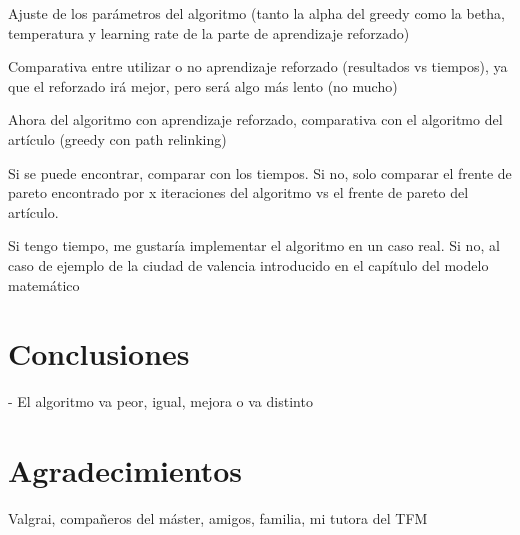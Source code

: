 \documentclass[12pt,a4paper]{book}
\begin{document}
Ajuste de los parámetros del algoritmo (tanto la alpha del greedy como la betha, temperatura y learning rate de la parte de aprendizaje reforzado)

Comparativa entre utilizar o no aprendizaje reforzado (resultados vs tiempos), ya que el reforzado irá mejor, pero será algo más lento (no mucho)

Ahora del algoritmo con aprendizaje reforzado, comparativa con el algoritmo del artículo (greedy con path relinking)

Si se puede encontrar, comparar con los tiempos. Si no, solo comparar el frente de pareto encontrado por x iteraciones del algoritmo vs el frente de pareto del artículo.

Si tengo tiempo, me gustaría implementar el algoritmo en un caso real. Si no, al caso de ejemplo de la ciudad de valencia introducido en el capítulo del modelo matemático

\chapter{Conclusiones}

- El algoritmo va peor, igual, mejora o va distinto 

\chapter{Agradecimientos}
Valgrai, compañeros del máster, amigos, familia, mi tutora del TFM
\end{document}
